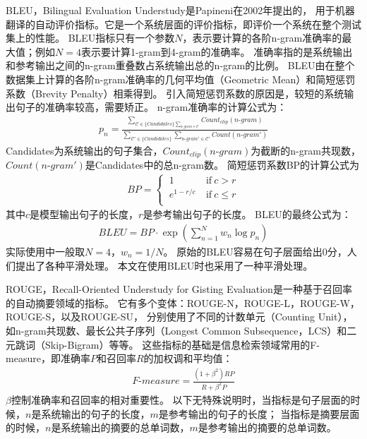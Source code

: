 BLEU，Bilingual Evaluation Understudy是Papineni在2002年提出的，
用于机器翻译的自动评价指标。它是一个系统层面的评价指标，即评价一个系统在整个测试集上的性能。
BLEU指标只有一个参数$N$，表示要计算的各阶n-gram准确率的最大值；例如$N = 4$表示要计算1-gram到4-gram的准确率。
准确率指的是系统输出和参考输出之间的n-gram重叠数占系统输出总的n-gram的比例。
BLEU由在整个数据集上计算的各阶n-gram准确率的几何平均值（Geometric Mean）和简短惩罚系数（Brevity Penalty）相乘得到。
引入简短惩罚系数的原因是，较短的系统输出句子的准确率较高，需要矫正。
n-gram准确率的计算公式为：
\begin{align}
    p_n = \frac{
    \sum_{\mathcal{C} \in \{\textit{Candidates}\}
    \sum_{\textit{n-gram} \in \mathcal{C}}}
    \textit{Count}_{\textit{clip}}(\textit{n-gram})
    }{
    \sum_{\mathcal{C'} \in \{\textit{Candidates}\}}
    \sum_{\textit{n-gram}' \in \mathcal{C'}}
    \textit{Count}(\textit{n-gram}')
    }
\end{align}
Candidates为系统输出的句子集合，$\textit{Count}_{\textit{clip}}(\textit{n-gram})$为截断的n-gram共现数，
$\textit{Count}(\textit{n-gram}')$是Candidates中的总n-gram数。
简短惩罚系数BP的计算公式为
\begin{align}
    \textit{BP} =
    \begin{cases}
        \ 1 \ & \text{if} \  c > r \\
        \ e^{1 - r/c} \ & \text{if} \  c \leq r \\
    \end{cases}
\end{align}
其中$c$是模型输出句子的长度，$r$是参考输出句子的长度。
BLEU的最终公式为：
\begin{align}
    \textit{BLEU} = \textit{BP} \cdot \exp \left( \sum_{n=1}^N w_n \log p_n \right)
\end{align}
实际使用中一般取$N = 4$，$w_n = 1 / N$。
原始的BLEU容易在句子层面给出0分，人们提出了各种平滑处理。
本文在使用BLEU时也采用了一种平滑处理。

ROUGE，Recall-Oriented Understudy for Gisting Evaluation是一种基于召回率的自动摘要领域的指标。
它有多个变体：ROUGE-N，ROUGE-L，ROUGE-W，ROUGE-S，以及ROUGE-SU，
分别使用了不同的计数单元（Counting Unit），如n-gram共现数、最长公共子序列（Longest Common Subsequence，LCS）和二元跳词（Skip-Bigram）等等。
这些指标的基础是信息检索领域常用的F-measure，即准确率$P$和召回率$R$的加权调和平均值：
\begin{align}
    \textit{F-measure} = \frac{(1 + \beta^2) RP}{R + \beta^2 P}
\end{align}
$\beta$控制准确率和召回率的相对重要性。
以下无特殊说明时，当指标是句子层面的时候，$n$是系统输出的句子的长度，$m$是参考输出的句子的长度；
当指标是摘要层面的时候，$n$是系统输出的摘要的总单词数，$m$是参考输出的摘要的总单词数。

